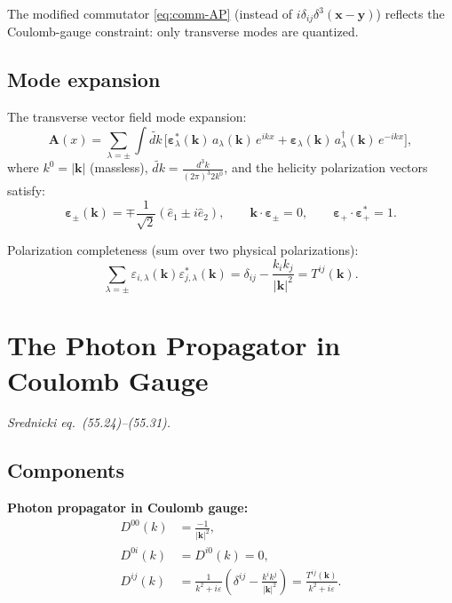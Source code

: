 \documentclass[12pt]{article}
\begin{document}
The modified commutator \eqref{eq:comm-AP} (instead of $i\delta_{ij}\delta^3(\mathbf{x}-\mathbf{y})$)
reflects the Coulomb-gauge constraint: only transverse modes are quantized.

\subsection{Mode expansion}

The transverse vector field mode expansion:
\begin{equation}\label{eq:mode-expansion}
  \mathbf{A}(x) = \sum_{\lambda=\pm}\int\!\widetilde{dk}\,
  \bigl[\boldsymbol\varepsilon^*_\lambda(\mathbf{k})\,a_\lambda(\mathbf{k})\,e^{ikx}
        + \boldsymbol\varepsilon_\lambda(\mathbf{k})\,a^\dagger_\lambda(\mathbf{k})\,e^{-ikx}\bigr],
\end{equation}
where $k^0 = |\mathbf{k}|$ (massless), $\widetilde{dk} = \frac{d^3k}{(2\pi)^3 2k^0}$,
and the helicity polarization vectors satisfy:
\begin{equation}\label{eq:helicity-pol}
  \boldsymbol\varepsilon_\pm(\mathbf{k}) = \mp\frac{1}{\sqrt{2}}(\hat e_1 \pm i\hat e_2),
  \qquad
  \mathbf{k}\cdot\boldsymbol\varepsilon_\pm = 0, \qquad
  \boldsymbol\varepsilon_+\cdot\boldsymbol\varepsilon_+^* = 1.
\end{equation}

Polarization completeness (sum over two physical polarizations):
\begin{equation}\label{eq:pol-completeness}
  \sum_{\lambda=\pm}\varepsilon_{i,\lambda}(\mathbf{k})\varepsilon_{j,\lambda}^*(\mathbf{k})
  = \delta_{ij} - \frac{k_ik_j}{|\mathbf{k}|^2} = T^{ij}(\mathbf{k}).
\end{equation}

\section{The Photon Propagator in Coulomb Gauge}

\textit{Srednicki eq.\ (55.24)--(55.31).}

\subsection{Components}

\begin{mdframed}[backgroundcolor=blue!5]
\textbf{Photon propagator in Coulomb gauge:}
\begin{align}
  D^{00}(k) &= \frac{-1}{|\mathbf{k}|^2}, \label{eq:D00}\\[4pt]
  D^{0i}(k) &= D^{i0}(k) = 0, \label{eq:D0i}\\[4pt]
  D^{ij}(k) &= \frac{1}{k^2+i\varepsilon}\left(\delta^{ij}
              - \frac{k^ik^j}{|\mathbf{k}|^2}\right)
              = \frac{T^{ij}(\mathbf{k})}{k^2+i\varepsilon}. \label{eq:Dij}
\end{align}
\end{mdframed}
\end{document}
